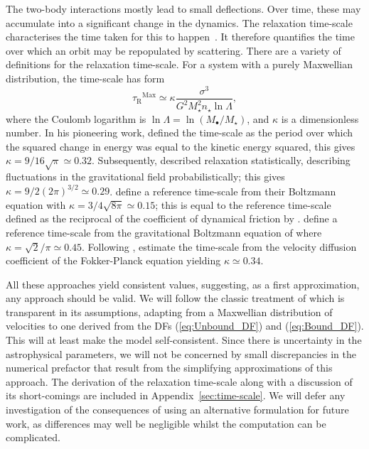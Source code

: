 \documentclass[useAMS,usedcolumn,usegraphicx,usenatbib]{mn2e}
\newcommand{\eqnref}[1]{(\ref{eq:#1})}
\newcommand{\apref}[1]{Appendix~\ref{sec:#1}}
\newcommand{\sub}[1]{\ensuremath{_\mathrm{#1}}}
\newcommand{\super}[1]{\ensuremath{^\mathrm{#1}}}
\begin{document}
The two-body interactions mostly lead to small deflections. Over time, these may accumulate into a significant change in the dynamics. The relaxation time-scale characterises the time taken for this to happen~\citep{Binney1987}. It therefore quantifies the time over which an orbit may be repopulated by scattering. There are a variety of definitions for the relaxation time-scale. For a system with a purely Maxwellian distribution, the time-scale has form
\begin{equation}
\tau\sub{R}\super{Max} \simeq \kappa\frac{\sigma^3}{G^2M_\star^2 n_\star\ln\Lambda},
\label{eq:tauMaxwell}
\end{equation}
where the Coulomb logarithm is $\ln\Lambda = \ln(M_\bullet/M_\star)$, and $\kappa$ is a dimensionless number. In his pioneering work, \citet{Chandrasekhar1941, Chandrasekhar1960} defined the time-scale as the period over which the squared change in energy was equal to the kinetic energy squared, this gives $\kappa = 9/16\sqrt{\pi} \simeq 0.32$. Subsequently, \citet{Chandrasekhar1941a} described relaxation statistically, describing fluctuations in the gravitational field probabilistically; this gives $\kappa = 9/2(2\pi)^{3/2} \simeq 0.29$. \citet{Bahcall1977} define a reference time-scale from their Boltzmann equation with $\kappa = 3/4\sqrt{8\pi} \simeq 0.15$; this is equal to the reference time-scale defined as the reciprocal of the coefficient of dynamical friction by \citet{Chandrasekhar1943a, Chandrasekhar1943}. \citet{Spitzer1958} define a reference time-scale from the gravitational Boltzmann equation of \citet{Spitzer1951} where $\kappa = \sqrt{2}/\pi \simeq 0.45$. Following \citet{Spitzer1971}, \citet[section 8.3.4]{Binney1987} estimate the time-scale from the velocity diffusion coefficient of the Fokker-Planck equation yielding $\kappa \simeq 0.34$.

All these approaches yield consistent values, suggesting, as a first approximation, any approach should be valid. We will follow the classic treatment of \citet[chapter 2]{Chandrasekhar1960} which is transparent in its assumptions, adapting from a Maxwellian distribution of velocities to one derived from the DFs \eqnref{Unbound_DF} and \eqnref{Bound_DF}. This will at least make the model self-consistent. Since there is uncertainty in the astrophysical parameters, we will not be concerned by small discrepancies in the numerical prefactor that result from the simplifying approximations of this approach. The derivation of the relaxation time-scale along with a discussion of its short-comings are included in \apref{time-scale}. We will defer any investigation of the consequences of using an alternative formulation for future work, as differences may well be negligible whilst the computation can be complicated.
\end{document}
